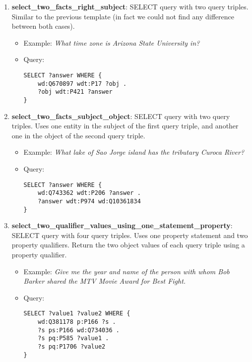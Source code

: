 \begin{enumerate}
    \item \textbf{select\_two\_facts\_right\_subject}: SELECT query with two query triples. Similar to 
    the previous template (in fact we could not find any difference between both cases).
    \begin{itemize}
        \item Example: \textit{What time zone is Arizona State University in?}
        \item Query:
        \begin{lstlisting}[basicstyle=\ttfamily,frame=single]        
SELECT ?answer WHERE { 
    wd:Q670897 wdt:P17 ?obj . 
    ?obj wdt:P421 ?answer
}
        \end{lstlisting}
    \end{itemize}
    
    \item \textbf{select\_two\_facts\_subject\_object}: SELECT query with two query triples. Uses one 
    entity in the subject of the first query triple, and another one in the object of the second 
    query triple.
    \begin{itemize}
        \item Example: \textit{What lake of Sao Jorge island has the tributary Curoca River?}
        \item Query:
        \begin{lstlisting}[basicstyle=\ttfamily,frame=single]        
SELECT ?answer WHERE { 
    wd:Q743362 wdt:P206 ?answer . 
    ?answer wdt:P974 wd:Q10361834
}
        \end{lstlisting}
    \end{itemize}
    
    \item \textbf{select\_two\_qualifier\_values\_using\_one\_statement\_property}: SELECT query with four 
    query triples. Uses one property statement and two property qualifiers. Return the two object 
    values of each query triple using a property qualifier.
    \begin{itemize}
        \item Example: \textit{Give me the year and name of the person with whom Bob Barker shared the 
        MTV Movie Award for Best Fight.}
        \item Query:
        \begin{lstlisting}[basicstyle=\ttfamily,frame=single]        
SELECT ?value1 ?value2 WHERE { 
    wd:Q381178 p:P166 ?s . 
    ?s ps:P166 wd:Q734036 . 
    ?s pq:P585 ?value1 . 
    ?s pq:P1706 ?value2 
}
        \end{lstlisting}
    \end{itemize}
    
\end{enumerate}
